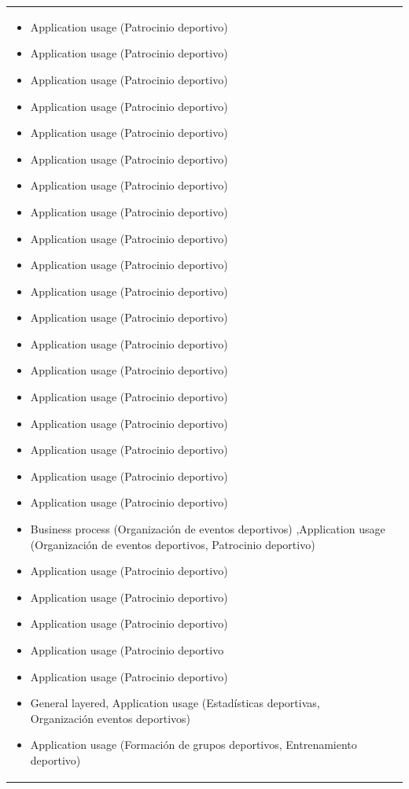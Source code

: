 \begin{table}[!htb]
\begin{center}
{\begin{tabular}{|p{7cm}|p{4cm}|}
\begin{itemize}
				\item Application usage (Patrocinio deportivo)
				\item Application usage (Patrocinio deportivo)
				\item Application usage (Patrocinio deportivo)
				\item Application usage (Patrocinio deportivo)
				\item Application usage (Patrocinio deportivo)
				\item Application usage (Patrocinio deportivo)
				\item Application usage (Patrocinio deportivo)
				\item Application usage (Patrocinio deportivo)
				\item Application usage (Patrocinio deportivo)
				\item Application usage (Patrocinio deportivo)
				\item Application usage (Patrocinio deportivo)
				\item Application usage (Patrocinio deportivo)
				\item Application usage (Patrocinio deportivo)
				\item Application usage (Patrocinio deportivo)
				\item Application usage (Patrocinio deportivo)
				\item Application usage (Patrocinio deportivo)
				\item Application usage (Patrocinio deportivo)
				\item Application usage (Patrocinio deportivo)
				\item Application usage (Patrocinio deportivo)
				\item Business process (Organización de eventos deportivos) ,Application usage (Organización de eventos deportivos, Patrocinio deportivo)
				\item Application usage (Patrocinio deportivo)
				\item Application usage (Patrocinio deportivo)
				\item Application usage (Patrocinio deportivo)
				\item Application usage (Patrocinio deportivo
				\item Application usage (Patrocinio deportivo)
				\item General layered, Application usage (Estadísticas deportivas, Organización eventos deportivos)
				\item Application usage (Formación de grupos deportivos, Entrenamiento deportivo)

\end{itemize}
\end{tabular}}
\end{center}
\end{table}
